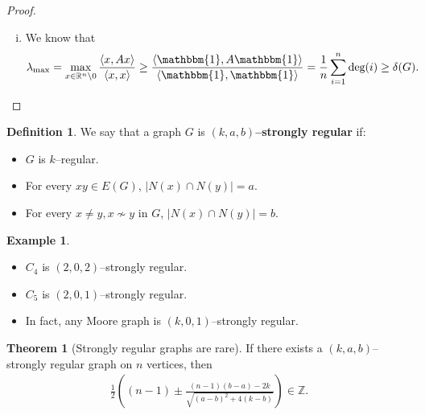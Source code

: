 \documentclass{article}
\theoremstyle{definition}
\newtheorem{theorem}{Theorem}[section]
\newtheorem{example}{Example}[section]
\newtheorem{defn}{Definition}[section]
\begin{document}
\begin{proof}
\begin{enumerate}[(i)]
        $(\implies)$: Let $-\Delta$ be an eigenvalue of $G$ with corresponding eigenvector $x=(x_1,\ldots,x_n)$. Let $x_i$ be such that $|x_i|=1$ and assume that $x_i=1$. We have 
        \begin{align*}
            -\Delta = - \Delta x_i = \sum_{j \sim i}^{} x_j \implies \text{deg}(i)=\Delta \text{ and } x_j = -1 ~\forall j \sim i.
        \end{align*}
        Now repeat this for all $j \in N(i)$ to see that $\text{deg}(j)=\Delta$ and all $x_k = 1 ~\forall k \sim j \sim i$. Analogously keep repeating until we reach all vertices in $G$ and see that $G$ is $\Delta$--regular and $x = (1,\ldots,1,-1,\ldots,-1)$ up to a permutation of the coordinates. Moreover, $V(G) = \{j \mid x_j=1\} \cup \{j \mid x_j = -1\}$ defines a bipartition of $G$.
        \item We know that
        \begin{align*}
            \lambda_{\max} = \max_{x \in \mathbb{R}^n\setminus 0}\frac{\langle x,Ax \rangle}{\langle x,x \rangle} \ge \frac{\langle \mathbbm{1},A \mathbbm{1} \rangle}{\langle \mathbbm{1},\mathbbm{1}\rangle} = \frac{1}{n} \sum_{i=1}^{n} \text{deg}(i) \ge \delta(G).
        \end{align*}
    \end{enumerate}
\end{proof}
\begin{defn}
    We say that a graph $G$ is \textbf{$(k,a,b)$--strongly regular} if:
    \begin{itemize}
        \item $G$ is $k$--regular.
        \item For every $xy \in E(G)$, $|N(x) \cap N(y)| = a$.
        \item For every $x \neq y, x \not\sim y$ in $G$, $|N(x) \cap N(y)|=b$.
    \end{itemize}
\end{defn}
\begin{example}
    \begin{itemize}
        \item $C_4$ is $(2,0,2)$--strongly regular.
        \item $C_5$ is $(2,0,1)$--strongly regular.
        \item In fact, any Moore graph is $(k,0,1)$--strongly regular.
    \end{itemize}
\end{example}
\begin{theorem}[Strongly regular graphs are rare]\label{7.2}
    If there exists a $(k,a,b)$--strongly regular graph on $n$ vertices, then 
    \begin{align*}
        \frac{1}{2}\left((n-1) \pm \frac{(n-1)(b-a)-2k}{\sqrt{(a-b)^2+4(k-b)}} \right) \in \mathbb{Z}.
    \end{align*}
\end{theorem}
\end{document}
